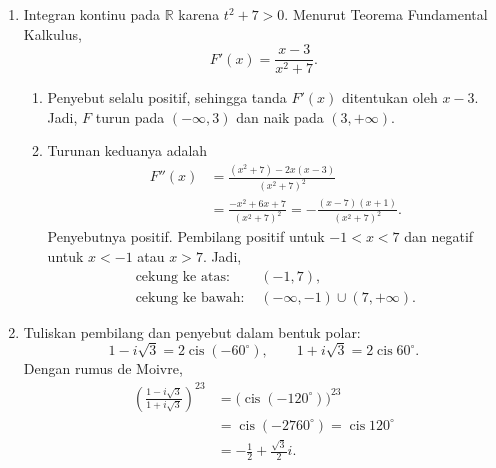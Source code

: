 \documentclass[11pt,a4paper]{article}
\begin{document}
\begin{enumerate}
    \item Integran kontinu pada $\mathbb{R}$ karena $t^2+7>0$. Menurut Teorema Fundamental Kalkulus,
    \[
        F'(x)=\frac{x-3}{x^2+7}.
    \]
    \begin{enumerate}
        \item Penyebut selalu positif, sehingga tanda $F'(x)$ ditentukan oleh $x-3$. Jadi, $F$ turun pada $\boxed{(-\infty,3)}$ dan naik pada $\boxed{(3,+\infty)}$.
        \item Turunan keduanya adalah
        \begin{align*}
            F''(x)&=\frac{(x^2+7)-2x(x-3)}{(x^2+7)^2}\\
                &=\frac{-x^2+6x+7}{(x^2+7)^2}
                =-\frac{(x-7)(x+1)}{(x^2+7)^2}.
        \end{align*}
        Penyebutnya positif. Pembilang positif untuk $-1<x<7$ dan negatif untuk $x<-1$ atau $x>7$. Jadi,
        \[
            \boxed{\begin{aligned}
                \text{cekung ke atas: }&(-1,7),\\
                \text{cekung ke bawah: }&(-\infty,-1)\cup(7,+\infty).
            \end{aligned}}
        \]
    \end{enumerate}

    \item Tuliskan pembilang dan penyebut dalam bentuk polar:
    \[
        1-i\sqrt3=2\operatorname{cis}(-60^\circ),
        \qquad
        1+i\sqrt3=2\operatorname{cis}60^\circ.
    \]
    Dengan rumus de Moivre,
    \begin{align*}
        \left(\frac{1-i\sqrt3}{1+i\sqrt3}\right)^{23}
            &=\bigl(\operatorname{cis}(-120^\circ)\bigr)^{23}\\
            &=\operatorname{cis}(-2760^\circ)
            =\operatorname{cis}120^\circ\\
            &=\boxed{-\frac12+\frac{\sqrt3}{2}i}.
    \end{align*}


\end{enumerate}
\end{document}
